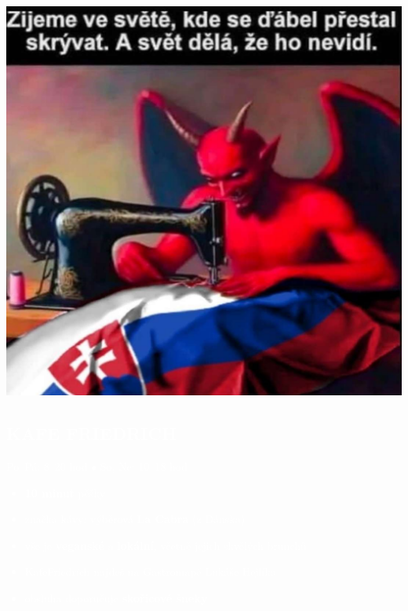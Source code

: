\documentclass{article}
\begin{document}
\begin{yellowbox}
  \begin{minipage}{0.27\textwidth}
    \vspace*{-10em}
    \includegraphics[width=\linewidth]{dulezite.jpg}
  \end{minipage}
  \hfill
  \begin{minipage}{0.7\textwidth}
    \vspace{-5pt}
    \textcolor{white}{
    \subsection*{KAFE FRIEDRICH}
    Po--Pá: 8--20 hod $\bullet$ So, Ne: 10--18 hod
    \small
    \begin{itemize}[leftmargin=10pt]
      \item \textbf{10 minut} pěšky
      \item značka kávy: výběrová \textbf{La Cabra} (z Dánska)
      \item vše je \textbf{veganské} a \textbf{lokální}, včetně jejich skvělých brunchů
      \item KafeFriedrich najdeš na Gastromapě Lukáše Hejlíka
      \item obsluha doporučuje \textbf{skořicové šneky}
    \end{itemize}
    }
    \vspace{10em}
  \end{minipage}
\end{yellowbox}
\end{document}
